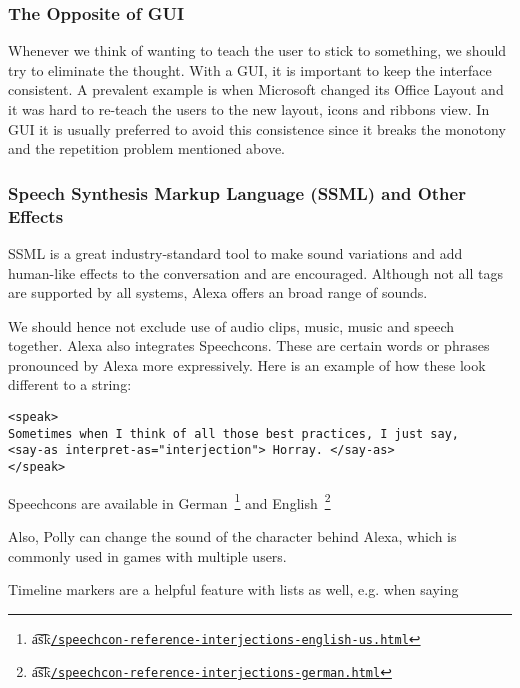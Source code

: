 \subsubsection*{The Opposite of GUI}
Whenever we think of wanting to teach the user to stick to something, we should try to eliminate the thought. With a GUI, it is important to keep the interface consistent. A prevalent example is when Microsoft changed its Office Layout and it was hard to re-teach the users to the new layout, icons and ribbons view. In GUI it is usually preferred to avoid this consistence since it breaks the monotony and the repetition problem mentioned above.

\subsubsection*{Speech Synthesis Markup Language (SSML) and Other Effects}
SSML is a great industry-standard tool to make sound variations and add human-like effects to the conversation and are encouraged. Although not all tags are supported by all systems, Alexa offers an broad range of sounds.

We should hence not exclude use of audio clips, music, music and speech together. Alexa also integrates Speechcons. These are certain words or phrases pronounced by Alexa more expressively. Here is an example of how these look different to a string:

\begin{verbatim}
<speak>
Sometimes when I think of all those best practices, I just say,
<say-as interpret-as="interjection"> Horray. </say-as> 
</speak>
\end{verbatim}



\noindent Speechcons are available in German~\footnote{\t{a\t{sk}}\href{https://developer.amazon.com/docs/custom-skills/speechcon-reference-interjections-english-us.html}{\lstinline|/speechcon-reference-interjections-english-us.html|}} and English~\footnote{\t{a\t{sk}}\href{https://developer.amazon.com/docs/custom-skills/speechcon-reference-interjections-german.html}{\lstinline|/speechcon-reference-interjections-german.html|}}

\noindent Also, Polly can change the sound of the character behind Alexa, which is commonly used in games with multiple users.

\noindent Timeline markers are a helpful feature with lists as well, e.g. when saying 

